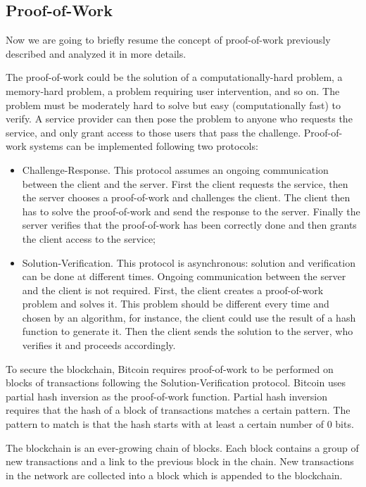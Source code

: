 \documentclass{article}
\begin{document}
\subsection*{Proof-of-Work}
Now we are going to briefly resume the concept of proof-of-work previously described and analyzed it in more details.\par\noindent
The proof-of-work could be the solution of a computationally-hard problem, a memory-hard problem, a problem requiring user intervention, and so on. The problem must be moderately hard to solve but easy (computationally fast) to verify. A service provider can then pose the problem to anyone who requests the service, and only grant access to those users that pass the challenge. Proof-of-work systems can be implemented following two protocols:
\begin{itemize}
    \item Challenge-Response. This protocol assumes an ongoing communication between the client and the server. First the client requests the service, then the server chooses a proof-of-work and challenges the client. The client then has to solve the proof-of-work and send the response to the server. Finally the server verifies that the proof-of-work has been correctly done and then grants the client access to the service;
    \item Solution-Verification. This protocol is asynchronous: solution and verification can be done at different times. Ongoing communication between the server and the client is not required. First, the client creates a proof-of-work problem and solves it. This problem should be different every time and chosen by an algorithm, for instance, the client could use the result of a hash function to generate it. Then the client sends the solution to the server, who verifies it and proceeds accordingly.
\end{itemize}
To secure the blockchain, Bitcoin requires proof-of-work to be performed on blocks of transactions following the Solution-Verification protocol. Bitcoin uses partial hash inversion as the proof-of-work function. Partial hash inversion requires that the hash of a block of transactions matches a certain pattern. The pattern to match is that the hash starts with at least a certain number of 0 bits.
\par\noindent The blockchain is an ever-growing chain of blocks. Each block contains a group of new transactions and a link to the previous block in the chain. New transactions in the network are collected into a block which is appended to the blockchain.\newline
\end{document}
